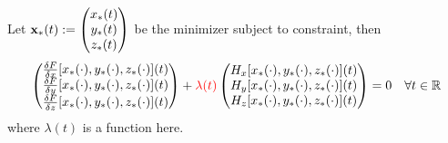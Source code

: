 \documentclass{article}
\begin{document}
    \begin{theorem}
        Let $\textbf{x}_*(t) := \begin{pmatrix}x_*(t)\\y_*(t)\\z_*(t)\end{pmatrix}$ be the minimizer subject to constraint, then
        \begin{align}
            \begin{pmatrix}
                \frac{\delta F}{\delta x}[x_*(\cdot), y_*(\cdot), z_*(\cdot)](t) \\
                \frac{\delta F}{\delta y}[x_*(\cdot), y_*(\cdot), z_*(\cdot)](t) \\
                \frac{\delta F}{\delta z}[x_*(\cdot), y_*(\cdot), z_*(\cdot)](t)
            \end{pmatrix}
            + \textcolor{red}{\lambda(t)}
            \begin{pmatrix}
                H_x[x_*(\cdot), y_*(\cdot), z_*(\cdot)](t) \\
                H_y[x_*(\cdot), y_*(\cdot), z_*(\cdot)](t) \\
                H_z[x_*(\cdot), y_*(\cdot), z_*(\cdot)](t)
            \end{pmatrix} = 0\quad \forall t \in \mathbb{R}
        \end{align}
        where $\lambda(t)$ is a function here.
    \end{theorem}
\end{document}
